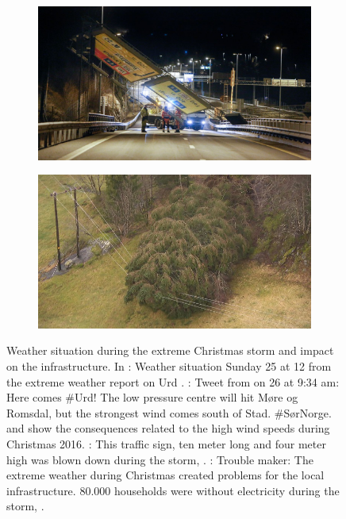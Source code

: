 \begin{figure}[t!]
\begin{subfigure}[b]{0.49\textwidth}
		\includegraphics[width=\textwidth]{./fig_introduction/street_sign_2512.jpg}
		\caption{}\label{fig:street_sign}
	\end{subfigure}
	\hfill
	\begin{subfigure}[b]{0.49\textwidth}
		\includegraphics[width=\textwidth]{./fig_introduction/tree_nrk_2812.jpg}
		\caption{}\label{fig:tree_elec}
	\end{subfigure}
	\caption{Weather situation during the extreme Christmas storm and impact on the infrastructure. In \protect{}: Weather situation Sunday \SI{25}{\dec} at \SI{12}{\UTC} from the extreme weather report on Urd \citep{olsen_ekstremvaerrapport._2017}.
		\protect{}: Tweet from \cite{meteorologene_her_2016} on \SI{26}{\dec} at 9:34 am: Here comes \#Urd! The low pressure centre will hit M{\o}re og Romsdal, but the strongest wind comes south of Stad. \#S{\o}rNorge.
		\protect{} and \protect{} show the consequences related to the high wind speeds during Christmas 2016.
		\protect{}: This traffic sign, ten meter long and four meter high was blown down during the storm, \citep{ruud_tonn_2016}.
		\protect{}: Trouble maker: The extreme weather during Christmas created problems for the local infrastructure. \num{80.000} households were without electricity during the storm, \citep{farestveit_80.000_2016}.} \label{fig:news}
\end{figure}